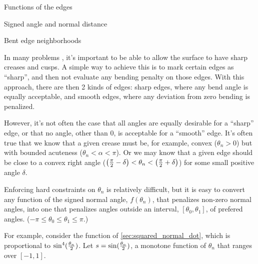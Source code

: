 \begin{plSection}{Functions of the edges}
\begin{plSection}{Signed angle and normal distance}
\end{plSection}%

\begin{plSection}{Bent edge neighborhoods}
\label{sec:Bent-edge-neighborhoods}

In many problems \cite{HoppeEtal:1994:SIGGRAPH,Hoppe:1994:Phd},
it's important to be able to allow the surface to have
sharp creases and cusps.
A simple way to achieve this is to mark
certain edges as ``sharp'',
and then not evaluate any bending penalty
on those edges.
With this approach, there are then 2 kinds of edges:
sharp edges, where any bend angle is equally acceptable,
and smooth edges, 
where any deviation from zero bending is penalized.

However, it's not often the case that all angles
are equally desirable for a ``sharp'' edge,
or that no angle, other than $0$, is acceptable
for a ``smooth'' edge.
It's often true that we know that a given crease
must be, for example, convex ($\theta_n > 0$)
but with bounded acuteness ($\theta_n < \alpha < \pi$).
Or we may know that a given edge should be close to
a convex right angle 
($\left( {\pi \over 2} - \delta \right) 
< \theta_n < 
\left( {\pi \over 2} + \delta \right)$)
for some small positive angle $\delta$.

Enforcing hard constraints on $\theta_n$
is relatively difficult,
but it is easy to convert any function
of the signed normal angle, $f(\theta_n)$,
that penalizes non-zero normal angles,
into one that penalizes angles 
outside an interval, $\left[\theta_0,\theta_1\right]$,
of prefered angles.
($-\pi \leq \theta_0 \leq \theta_1 \leq \pi$.)

For example,
consider the function of \cref{sec:squared_normal_dot},
which is proportional to $\sin^4({\theta_n \over 2})$. 
Let $s = \sin({\theta_n \over 2})$,
a monotone function of $\theta_n$ 
that ranges over $\left[ -1, 1 \right]$.


\end{plSection}
\end{plSection}
